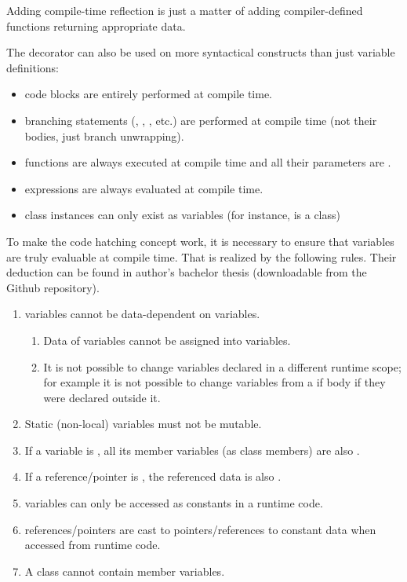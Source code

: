 \documentclass{ExcelAtFIT}
\begin{document}
Adding compile-time reflection is just a matter of adding compiler-defined functions returning appropriate \ctime data.

The  decorator can also be used on more syntactical constructs than just variable definitions:
\begin{itemize}
	\item \ctime code blocks are entirely performed at compile time.
	\item \ctime branching statements (, , , etc.) are performed at compile time (not their bodies, just branch unwrapping).
	\item \ctime functions are always executed at compile time and all their parameters are \ctime.
	\item \ctime expressions are always evaluated at compile time.
	\item \ctime class instances can only exist as \ctime variables (for instance,  is a \ctime class)
\end{itemize}

To make the code hatching concept work, it is necessary to ensure that \ctime variables are truly evaluable at compile time. That is realized by the following rules. Their deduction can be found in author's bachelor thesis \cite{MyThesis} (downloadable from the Github repository).
\begin{enumerate}
	\item \ctime variables cannot be data-dependent on \nonctime variables.
	\begin{enumerate}
		\item Data of \nonctime variables cannot be assigned into \ctime variables.
		\item It is not possible to change \ctime variables declared in a different runtime scope; for example it is not possible to change \ctime variables from a \nonctime if body if they were declared outside it.
	\end{enumerate}
	\item Static (non-local) \ctime variables must not be mutable.
	\item If a variable is \ctime, all its member variables (as class members) are also \ctime.
	\item If a reference/pointer is \ctime, the referenced data is also \ctime.
	\item \ctime variables can only be accessed as constants in a runtime code.
	\item \ctime references/pointers are cast to pointers/references to constant data when accessed from runtime code.
	\item A \nonctime class cannot contain member \ctime variables.
\end{enumerate}
\end{document}
